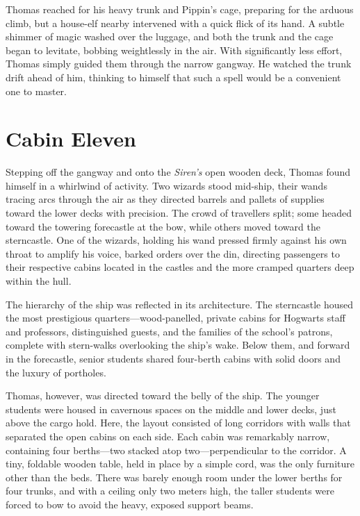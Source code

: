 Thomas reached for his heavy trunk and Pippin's cage, preparing for the arduous climb, but a house-elf nearby intervened with a quick flick of its hand. A subtle shimmer of magic washed over the luggage, and both the trunk and the cage began to levitate, bobbing weightlessly in the air. With significantly less effort, Thomas simply guided them through the narrow gangway. He watched the trunk drift ahead of him, thinking to himself that such a spell would be a convenient one to master.

\section*{Cabin Eleven}

Stepping off the gangway and onto the \textit{Siren's} open wooden deck, Thomas found himself in a whirlwind of activity. Two wizards stood mid-ship, their wands tracing arcs through the air as they directed barrels and pallets of supplies toward the lower decks with precision. The crowd of travellers split; some headed toward the towering forecastle at the bow, while others moved toward the sterncastle. One of the wizards, holding his wand pressed firmly against his own throat to amplify his voice, barked orders over the din, directing passengers to their respective cabins located in the castles and the more cramped quarters deep within the hull.

The hierarchy of the ship was reflected in its architecture. The sterncastle housed the most prestigious quarters---wood-panelled, private cabins for Hogwarts staff and professors, distinguished guests, and the families of the school's patrons, complete with stern-walks overlooking the ship's wake. Below them, and forward in the forecastle, senior students shared four-berth cabins with solid doors and the luxury of portholes.

Thomas, however, was directed toward the belly of the ship. The younger students were housed in cavernous spaces on the middle and lower decks, just above the cargo hold. Here, the layout consisted of long corridors with walls that separated the open cabins on each side. Each cabin was remarkably narrow, containing four berths---two stacked atop two---perpendicular to the corridor. A tiny, foldable wooden table, held in place by a simple cord, was the only furniture other than the beds. There was barely enough room under the lower berths for four trunks, and with a ceiling only two meters high, the taller students were forced to bow to avoid the heavy, exposed support beams.

